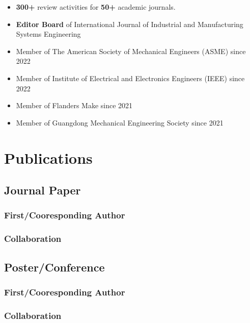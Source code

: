 \documentclass{resume}
\begin{document}
\begin{itemize}[parsep=0.5ex]
  \item \textbf{300+} review activities for \textbf{50+} academic journals.
  \item \textbf{Editor Board} of International Journal of Industrial and Manufacturing Systems Engineering
  \item Member of The American Society of Mechanical Engineers (ASME) since 2022
  \item Member of Institute of Electrical and Electronics Engineers (IEEE) since 2022
  \item Member of Flanders Make since 2021
  \item Member of Guangdong Mechanical Engineering Society since 2021
\end{itemize}

\vspace{5mm}
\section{Publications}
\subsection{Journal Paper}
%   
%   
\begin{enumerate}
  \subsubsection{First/Cooresponding Author}
  
  \subsubsection{Collaboration}
  
\end{enumerate}

\subsection{Poster/Conference}
%   
%   
\begin{enumerate}
  \subsubsection{First/Cooresponding Author}
  
  \subsubsection{Collaboration}
  
\end{enumerate}
\end{document}
